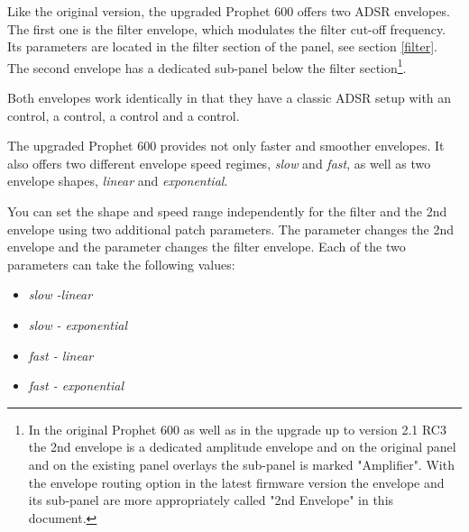 Like the original version, the upgraded Prophet 600 offers two ADSR envelopes. The first one is the filter envelope, which modulates the filter cut-off frequency. Its parameters are located in the filter section of the panel, see section \ref{filter}. The second envelope has a dedicated sub-panel below the filter section\footnote{In the original Prophet 600 as well as in the upgrade up to version 2.1 RC3 the 2nd envelope is a dedicated amplitude envelope and on the original panel and on the existing panel overlays the sub-panel is marked "Amplifier". With the envelope routing option in the latest firmware version the envelope and its sub-panel are more appropriately called "2nd Envelope" in this document.}.

Both envelopes work identically in that they have a classic ADSR setup with an \attack control, a \decay control, a \sustain control and a \release control. 

\begin{center}
\end{center}

The upgraded Prophet 600 provides not only faster and smoother envelopes. It also offers two different envelope speed regimes, \textit{slow} and \textit{fast}, as well as two envelope shapes, \textit{linear} and \textit{exponential}.

You can set the shape and speed range independently for the filter and the 2nd envelope using two additional patch parameters. The parameter \secndenv changes the 2nd envelope and the parameter \filenv changes the filter envelope. Each of the two parameters can take the following values:

\begin{itemize}
  \setlength\itemsep{0cm}
  \item \textit{slow -linear}
  \item \textit{slow - exponential}
  \item \textit{fast - linear}
  \item \textit{fast - exponential}
\end{itemize}
 
